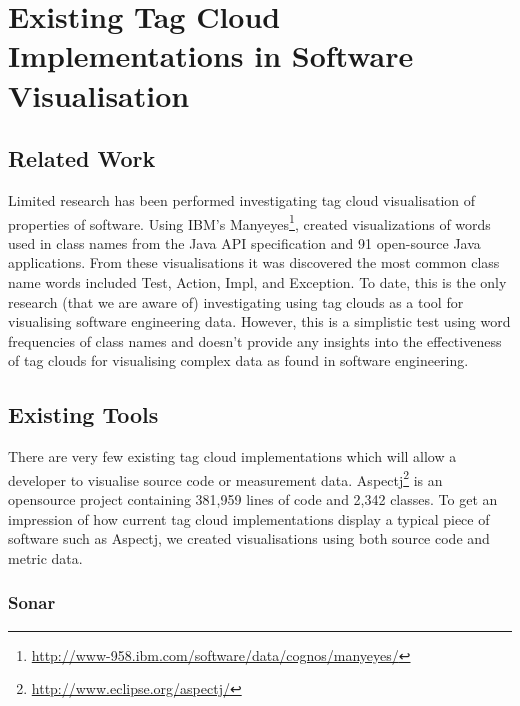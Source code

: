 \chapter{Existing Tag Cloud Implementations in Software Visualisation}
\ifpdf
    \graphicspath{{Chapter2/Chapter2Figs/PNG/}{Chapter2/Chapter2Figs/PDF/}{Chapter2/Chapter2Figs/}}
\else
    \graphicspath{{Chapter2/Chapter2Figs/EPS/}{Chapter2/Chapter2Figs/}}
\fi

\section{Related Work}

Limited research has been performed investigating tag cloud visualisation of properties of software. Using IBM's Manyeyes\footnote{\url{http://www-958.ibm.com/software/data/cognos/manyeyes/}}, \citet{anslow08} created visualizations of words used in class names from the Java API specification and 91 open-source Java applications. From these visualisations it was discovered the most common class name words included Test, Action, Impl, and Exception. To date, this is the only research (that we are aware of) investigating using tag clouds as a tool for visualising software engineering data. However, this is a simplistic test using word frequencies of class names and doesn't provide any insights into the effectiveness of tag clouds for visualising complex data as found in software engineering.

\section{Existing Tools}

There are very few existing tag cloud implementations which will allow a developer to visualise source code or measurement data. Aspectj\footnote{\url{http://www.eclipse.org/aspectj/}} is an opensource project containing 381,959 lines of code and 2,342 classes. To get an impression of how current tag cloud implementations display a typical piece of software such as Aspectj, we created visualisations using both source code and metric data.

\subsection{Sonar}

